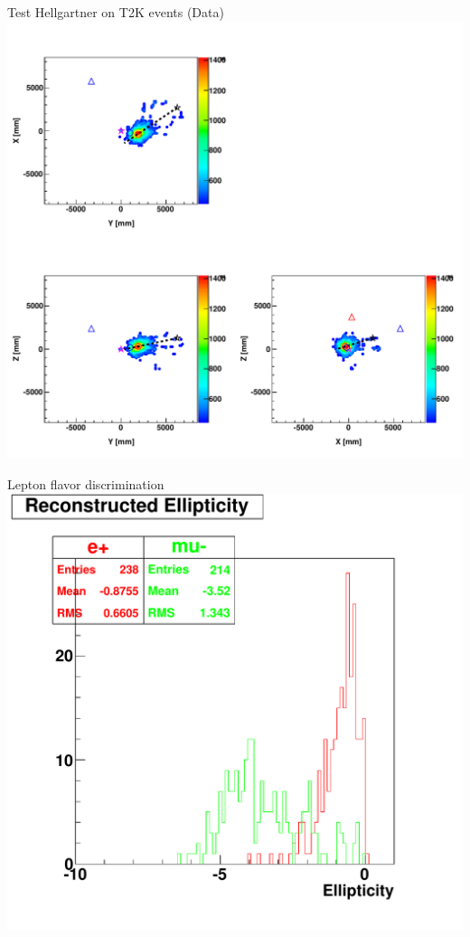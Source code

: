 \documentclass[14pt]{beamer}
\begin{document}
\begin{frame}{Test Hellgartner on T2K events (Data)}
	\centering
	\includegraphics[width=0.8\linewidth]{fom_map__run11331_evt29962767.pdf}
\end{frame}

\begin{frame}{Lepton flavor discrimination}
	\centering
	\includegraphics[width=0.8\linewidth]{emu_mtq_recon_ellipticity-3Mcut.pdf}
\end{frame}
\end{document}
